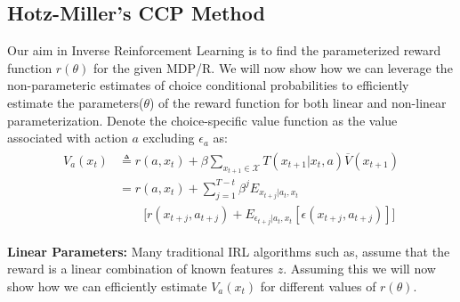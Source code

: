 \documentclass{article}
\renewcommand{\vec}[1]{\mbox{\bm{$#1$}}}
\begin{document}

\clearpage

\subsection{Hotz-Miller's CCP Method}

Our aim in Inverse Reinforcement Learning is to find the parameterized reward function $r(\theta)$ for the given MDP/R. We will now show how we can leverage the non-parameteric estimates of choice conditional probabilities to efficiently estimate the parameters($\theta$) of the reward function for both linear and non-linear parameterization. 
Denote the choice-specific value function as the value associated with action $a$ excluding $\epsilon_a$ as:
\begin{align}\label{eq:vamax}
\begin{split}
V_a(x_t) &\triangleq r(a,x_t)+\beta \sum_{x_{t+1}\in\mathcal{X}}T(x_{t+1}|x_t,a) \overline{V}(x_{t+1}) \\
&=r(a, x_t) + \sum_{j=1}^{T-t}\beta^{j}E_{x_{t+j}|a_t,x_t} \\
& \qquad \big[r(x_{t+j}, a_{t+j})+ E_{\epsilon_{t+j}|a_t, x_t}\left[\epsilon(x_{t+j}, a_{t+j})\right] \big]
\end{split}
\end{align}

\textbf{Linear Parameters:} Many traditional IRL algorithms such as, \cite{abbeel2004apprenticeship} \cite{ziebart} assume that the reward is a linear combination of known features $z$. Assuming this we will now show how we can efficiently estimate $V_a(x_t)$ for different values of $r(\theta)$.
\end{document}
